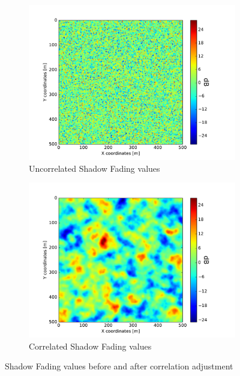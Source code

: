 \begin{figure}
\centering
\begin{subfigure}{.5\textwidth}
  \centering
  \includegraphics[width=1.1\linewidth]{figures/noise_before}
  \caption{Uncorrelated Shadow Fading values}
  \label{fig:sf_no_correlation}
\end{subfigure}%
\begin{subfigure}{.5\textwidth}
  \centering
  \includegraphics[width=1.1\linewidth]{figures/noise_after}
  \caption{Correlated Shadow Fading values}
  \label{fig:sf_correlated}
\end{subfigure}
\caption{Shadow Fading values before and after correlation adjustment}
\label{fig:SF}
\end{figure}


